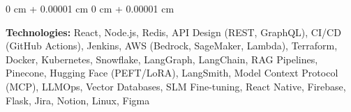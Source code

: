 \documentclass[10pt, letterpaper]{article}
\newenvironment{onecolentry}{
    \begin{adjustwidth}{
        0 cm + 0.00001 cm
    }{
        0 cm + 0.00001 cm
    }
}{
    \end{adjustwidth}
} %
\begin{document}
    \vspace{0.2 cm}

    \begin{onecolentry}
        \textbf{Technologies:} React, Node.js, Redis, API Design (REST, GraphQL), CI/CD (GitHub Actions), Jenkins, AWS (Bedrock, SageMaker, Lambda), Terraform, Docker, Kubernetes, Snowflake, LangGraph, LangChain, RAG Pipelines, Pinecone, Hugging Face (PEFT/LoRA), LangSmith, Model Context Protocol (MCP), LLMOps, Vector Databases, SLM Fine-tuning, React Native, Firebase, Flask, Jira, Notion, Linux, Figma
        
        \fontsize{0.0001pt}{1pt}
    \end{onecolentry}

    
\end{document}
